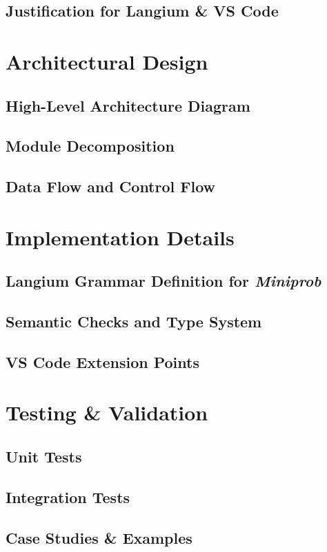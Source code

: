 \documentclass[11pt]{report}
\begin{document}
\section{Justification for Langium \& VS Code}

\chapter{Architectural Design}
\section{High-Level Architecture Diagram}
\section{Module Decomposition}
\section{Data Flow and Control Flow}

\chapter{Implementation Details}
\label{sec:langium-grammar}
\section{Langium Grammar Definition for \textit{Miniprob}}
\section{Semantic Checks and Type System}
\section{VS Code Extension Points}

\chapter{Testing \& Validation}
\section{Unit Tests}
\section{Integration Tests}
\section{Case Studies \& Examples}
\end{document}
